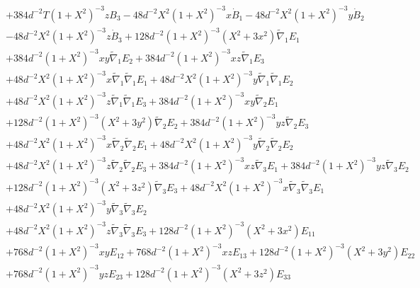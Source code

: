 \documentclass[10pt,letterpaper]{article}
\numberwithin{equation}{section}
\begin{document}
\begin{appendices}
\begin{eqnarray}
&& + 384 d^{-2} T (1 + X^2)^{-3} z B_{3} - 48 d^{-2} X^2 (1 + X^2)^{-3} x \dot{B}_{1} - 48 d^{-2} X^2 (1 + X^2)^{-3} y \dot{B}_{2} \nonumber \\ 
&& - 48 d^{-2} X^2 (1 + X^2)^{-3} z \dot{B}_{3} + 128 d^{-2} (1 + X^2)^{-3} (X^2 + 3 x^2) \tilde{\nabla}_{1}E_{1} \nonumber \\ 
&& + 384 d^{-2} (1 + X^2)^{-3} x y \tilde{\nabla}_{1}E_{2} + 384 d^{-2} (1 + X^2)^{-3} x z \tilde{\nabla}_{1}E_{3} \nonumber \\ 
&& + 48 d^{-2} X^2 (1 + X^2)^{-3} x \tilde{\nabla}_{1}\tilde{\nabla}_{1}E_{1} + 48 d^{-2} X^2 (1 + X^2)^{-3} y \tilde{\nabla}_{1}\tilde{\nabla}_{1}E_{2} \nonumber \\ 
&& + 48 d^{-2} X^2 (1 + X^2)^{-3} z \tilde{\nabla}_{1}\tilde{\nabla}_{1}E_{3} + 384 d^{-2} (1 + X^2)^{-3} x y \tilde{\nabla}_{2}E_{1} \nonumber \\ 
&& + 128 d^{-2} (1 + X^2)^{-3} (X^2 + 3 y^2) \tilde{\nabla}_{2}E_{2} + 384 d^{-2} (1 + X^2)^{-3} y z \tilde{\nabla}_{2}E_{3} \nonumber \\ 
&& + 48 d^{-2} X^2 (1 + X^2)^{-3} x \tilde{\nabla}_{2}\tilde{\nabla}_{2}E_{1} + 48 d^{-2} X^2 (1 + X^2)^{-3} y \tilde{\nabla}_{2}\tilde{\nabla}_{2}E_{2} \nonumber \\ 
&& + 48 d^{-2} X^2 (1 + X^2)^{-3} z \tilde{\nabla}_{2}\tilde{\nabla}_{2}E_{3} + 384 d^{-2} (1 + X^2)^{-3} x z \tilde{\nabla}_{3}E_{1} + 384 d^{-2} (1 + X^2)^{-3} y z \tilde{\nabla}_{3}E_{2} \nonumber \\ 
&& + 128 d^{-2} (1 + X^2)^{-3} (X^2 + 3 z^2) \tilde{\nabla}_{3}E_{3} + 48 d^{-2} X^2 (1 + X^2)^{-3} x \tilde{\nabla}_{3}\tilde{\nabla}_{3}E_{1} \nonumber \\ 
&& + 48 d^{-2} X^2 (1 + X^2)^{-3} y \tilde{\nabla}_{3}\tilde{\nabla}_{3}E_{2} \nonumber \\ 
&& + 48 d^{-2} X^2 (1 + X^2)^{-3} z \tilde{\nabla}_{3}\tilde{\nabla}_{3}E_{3}+128 d^{-2} (1 + X^2)^{-3} (X^2 + 3 x^2) E_{11} \nonumber \\ 
&& + 768 d^{-2} (1 + X^2)^{-3} x y E_{12} + 768 d^{-2} (1 + X^2)^{-3} x z E_{13} + 128 d^{-2} (1 + X^2)^{-3} (X^2 + 3 y^2) E_{22} \nonumber \\ 
&& + 768 d^{-2} (1 + X^2)^{-3} y z E_{23} + 128 d^{-2} (1 + X^2)^{-3} (X^2 + 3 z^2) E_{33}
\end{eqnarray}
\end{appendices}
\end{document}
